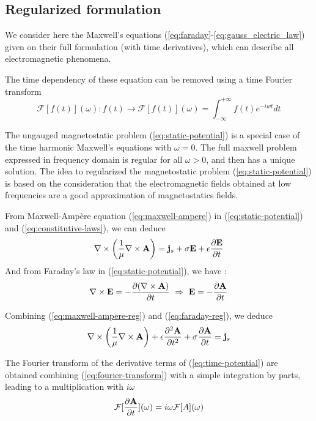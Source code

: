 \subsection{Regularized formulation}
\label{sec:regul-maxwell}
We consider here the Maxwell's equations
(\ref{eq:faraday}-\ref{eq:gauss_electric_law}) given on their full formulation
(with time derivatives), which can describe all electromagnetic phenomena.

The time dependency of these equation can be removed using a time Fourier
transform
\begin{equation}
  \label{eq:fourier-transform}
  \mathcal{F}[f(t)](\omega) : f(t) \longrightarrow \mathcal{F}[f(t)](\omega)
  = \int_{-\infty}^{+\infty} f(t) e^{-iwt} dt
\end{equation}

The ungauged magnetostatic problem (\ref{eq:static-potential}) is a special case
of the time harmonic Maxwell's equations with $\omega = 0$. The full maxwell
problem expressed in frequency domain is regular for all $\omega > 0$, and then
has a unique solution. The idea to regularized the magnetostatic problem
(\ref{eq:static-potential}) is based on the consideration that the
electromagnetic fields obtained at low frequencies are a good approximation of
magnetostatics fields.

From Maxwell-Ampère equation (\ref{eq:maxwell-ampere}) in
(\ref{eq:static-potential}) and (\ref{eq:constitutive-laws}), we can deduce
\begin{equation}
  \label{eq:maxwell-ampere-reg}
  \nabla \times \left( \frac{1}{\mu} \nabla \times \mathbf{A} \right)
  = \mathbf{j}_s + \sigma \mathbf{E} + \epsilon \frac{\partial \mathbf{E}}{\partial t}
\end{equation}
And from Faraday's law in (\ref{eq:static-potential}), we have :
\begin{equation}
  \label{eq:faraday-reg}
  \nabla \times \mathbf{E} = -\frac{\partial (\nabla \times \mathbf{A}) }{\partial t}
  ~\Rightarrow ~\mathbf{E} = -\frac{\partial \mathbf{A}}{\partial t}
\end{equation}

Combining (\ref{eq:maxwell-ampere-reg}) and (\ref{eq:faraday-reg}), we deduce
\begin{equation}
  \label{eq:time-potential}
  \nabla \times \left( \frac{1}{\mu} \nabla \times \mathbf{A} \right)
  + \epsilon \frac{\partial^2 \mathbf{A}}{\partial t^2}
  + \sigma \frac{\partial \mathbf{A}}{\partial t}
  = \mathbf{j}_s
\end{equation}

The Fourier transform of the derivative terms of (\ref{eq:time-potential}) are
obtained combining (\ref{eq:fourier-transform}) with a simple integration by
parts, leading to a multiplication with $i \omega$
\begin{equation*}
  \mathcal{F}[\frac{\partial \mathbf{A}}{\partial t}](\omega)
  = i \omega \mathcal{F}[A](\omega)
\end{equation*}


